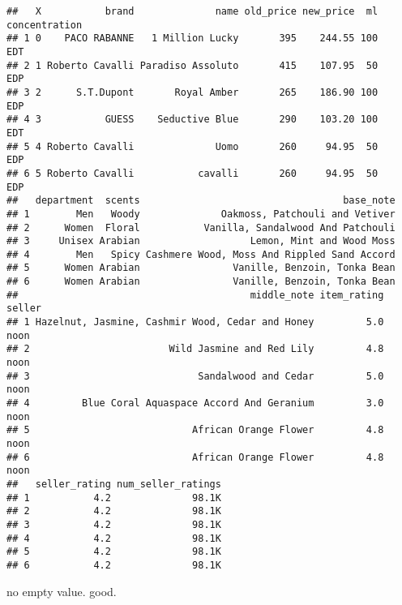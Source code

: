 \documentclass[
]{article}
\begin{document}
\begin{verbatim}
##   X           brand              name old_price new_price  ml concentration
## 1 0    PACO RABANNE   1 Million Lucky       395    244.55 100           EDT
## 2 1 Roberto Cavalli Paradiso Assoluto       415    107.95  50           EDP
## 3 2      S.T.Dupont       Royal Amber       265    186.90 100           EDP
## 4 3           GUESS    Seductive Blue       290    103.20 100           EDT
## 5 4 Roberto Cavalli              Uomo       260     94.95  50           EDP
## 6 5 Roberto Cavalli           cavalli       260     94.95  50           EDP
##   department  scents                                   base_note
## 1        Men   Woody              Oakmoss, Patchouli and Vetiver
## 2      Women  Floral           Vanilla, Sandalwood And Patchouli
## 3     Unisex Arabian                   Lemon, Mint and Wood Moss
## 4        Men   Spicy Cashmere Wood, Moss And Rippled Sand Accord
## 5      Women Arabian                Vanille, Benzoin, Tonka Bean
## 6      Women Arabian                Vanille, Benzoin, Tonka Bean
##                                        middle_note item_rating seller
## 1 Hazelnut, Jasmine, Cashmir Wood, Cedar and Honey         5.0   noon
## 2                        Wild Jasmine and Red Lily         4.8   noon
## 3                             Sandalwood and Cedar         5.0   noon
## 4         Blue Coral Aquaspace Accord And Geranium         3.0   noon
## 5                            African Orange Flower         4.8   noon
## 6                            African Orange Flower         4.8   noon
##   seller_rating num_seller_ratings
## 1           4.2              98.1K
## 2           4.2              98.1K
## 3           4.2              98.1K
## 4           4.2              98.1K
## 5           4.2              98.1K
## 6           4.2              98.1K
\end{verbatim}

no empty value. good.
\end{document}

